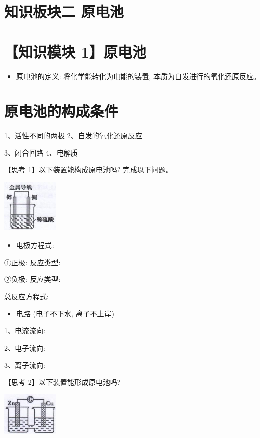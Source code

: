 \documentclass[10pt]{article}
\begin{document}
\section*{知识板块二 原电池}

\section*{【知识模块 1】原电池}

\begin{itemize}
\item 原电池的定义: 将化学能转化为电能的装置, 本质为自发进行的氧化还原反应。
\end{itemize}

\section*{原电池的构成条件}

1、活性不同的两极 2、自发的氧化还原反应

3、闭合回路 4、电解质

【思考 1】以下装置能构成原电池吗? 完成以下问题。

\begin{center}
\includegraphics[max width=0.2\textwidth]{images/0190d978-baee-71c0-9ae7-986c76919c41_0_416326.jpg}
\end{center}

\begin{itemize}
\item 电极方程式:
\end{itemize}

①正极: 反应类型:

②负极: 反应类型:

总反应方程式:

\begin{itemize}
\item 电路 (电子不下水, 离子不上岸)
\end{itemize}

1、电流流向:

2、电子流向:

3、离子流向:

【思考 2】以下装置能形成原电池吗?

\begin{center}
\includegraphics[max width=0.2\textwidth]{images/0190d978-baee-71c0-9ae7-986c76919c41_0_323382.jpg}
\end{center}
\end{document}
